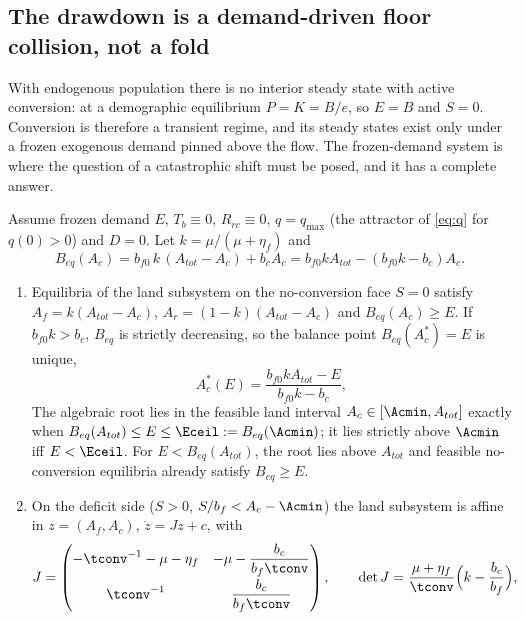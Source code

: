 \subsection{The drawdown is a demand-driven floor collision, not a fold}\label{sec:ceiling}

With endogenous population there is no interior steady state with active conversion: at a demographic equilibrium $P=K=B/e$, so $E=B$ and $S=0$. Conversion is therefore a transient regime, and its steady states exist only under a frozen exogenous demand pinned above the flow. The frozen-demand system is where the question of a catastrophic shift must be posed, and it has a complete answer.

\begin{proposition}\label{prop:ceiling}
Assume frozen demand $E$, $T_b\equiv0$, $R_{rc}\equiv0$, $q=q_{\max}$ (the attractor of \eqref{eq:q} for $q(0)>0$) and $D=0$. Let $k=\mu/(\mu+\eta_f)$ and
\begin{equation}\label{eq:Beq}
B_{eq}(A_c)=b_{f0}\,k\,(A_{tot}-A_c)+b_cA_c=b_{f0}kA_{tot}-(b_{f0}k-b_c)A_c .
\end{equation}
\begin{enumerate}[label=(\roman*)]
\item Equilibria of the land subsystem on the no-conversion face $S=0$ satisfy $A_f=k(A_{tot}-A_c)$, $A_r=(1-k)(A_{tot}-A_c)$ and $B_{eq}(A_c)\ge E$. If $b_{f0}k>b_c$, $B_{eq}$ is strictly decreasing, so the balance point $B_{eq}(A_c^*)=E$ is unique,
\begin{equation}\label{eq:Acstar}
A_c^*(E)=\frac{b_{f0}kA_{tot}-E}{b_{f0}k-b_c},
\end{equation}
The algebraic root lies in the feasible land interval $A_c\in[\Acmin,A_{tot}]$ exactly when $B_{eq}(A_{tot})\le E\le\Eceil:=B_{eq}(\Acmin)$; it lies strictly above $\Acmin$ iff $E<\Eceil$. For $E<B_{eq}(A_{tot})$, the root lies above $A_{tot}$ and feasible no-conversion equilibria already satisfy $B_{eq}\ge E$.
\item On the deficit side ($S>0$, $S/b_f<A_c-\Acmin$) the land subsystem is affine in $z=(A_f,A_c)$, $\dot z=Jz+c$, with
\begin{equation}\label{eq:J}
J=\begin{pmatrix}-\tconv^{-1}-\mu-\eta_f & -\mu-\dfrac{b_c}{b_f\tconv}\\[8pt] \tconv^{-1} & \dfrac{b_c}{b_f\tconv}\end{pmatrix},
\qquad \det J=\frac{\mu+\eta_f}{\tconv}\Big(k-\frac{b_c}{b_f}\Big),

\end{equation}
\end{enumerate}
\end{proposition}
